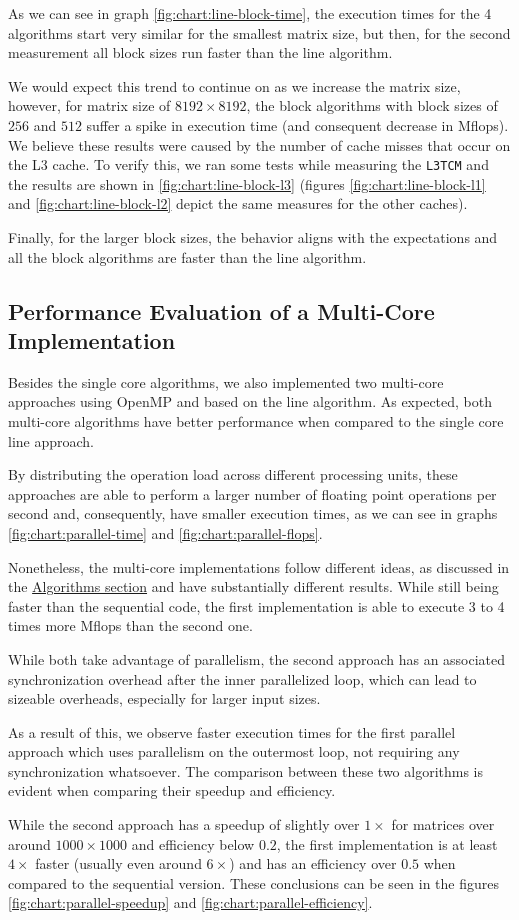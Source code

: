 As we can see in graph \ref{fig:chart:line-block-time}, the execution times for the 4 algorithms start very similar for the smallest matrix size, but then, for the second measurement all block sizes run faster than the line algorithm. 

We would expect this trend to continue on as we increase the matrix size, however, for matrix size of $8192 \times 8192$, the block algorithms with block sizes of $256$ and $512$ suffer a spike in execution time (and consequent decrease in Mflops). We believe these results were caused by the number of cache misses that occur on the L3 cache. To verify this, we ran some tests while measuring the \verb#L3TCM# and the results are shown in \ref{fig:chart:line-block-l3} (figures \ref{fig:chart:line-block-l1} and \ref{fig:chart:line-block-l2} depict the same measures for the other caches). 

Finally, for the larger block sizes, the behavior aligns with the expectations and all the block algorithms are faster than the line algorithm.

\subsection{Performance Evaluation of a Multi-Core Implementation}

Besides the single core algorithms, we also implemented two multi-core approaches using OpenMP and based on the line algorithm.
As expected, both multi-core algorithms have better performance when compared to the single core line approach. 

By distributing the operation load across different processing units, these approaches are able to perform a larger number of floating point operations per second and, consequently, have smaller execution times, as we can see in graphs \ref{fig:chart:parallel-time} and \ref{fig:chart:parallel-flops}.

Nonetheless, the multi-core implementations follow different ideas, as discussed in the \hyperref[section:algorithms]{Algorithms section} and have substantially different results. While still being faster than the sequential code, the first implementation is able to execute 3 to 4 times more Mflops than the second one.

While both take advantage of parallelism, the second approach has an associated synchronization overhead after the inner parallelized loop, which can lead to sizeable overheads, especially for larger input sizes.

As a result of this, we observe faster execution times for the first parallel approach which uses parallelism on the outermost loop, not requiring any synchronization whatsoever. The comparison between these two algorithms is evident when comparing their speedup and efficiency. 

While the second approach has a speedup of slightly over $1\times$ for matrices over around $1000 \times 1000$ and efficiency below $0.2$, the first implementation is at least $4\times$ faster (usually even around $6\times$) and has an efficiency over $0.5$ when compared to the sequential version. These conclusions can be seen in the figures \ref{fig:chart:parallel-speedup} and \ref{fig:chart:parallel-efficiency}.
